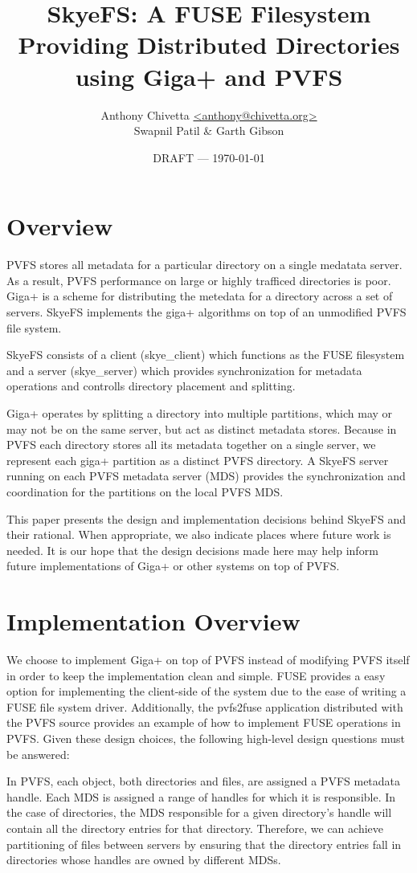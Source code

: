 \documentclass[letterpaper]{article}
\title{SkyeFS: A FUSE Filesystem Providing Distributed Directories using Giga+
and PVFS}
\author{Anthony Chivetta \url{<anthony@chivetta.org>}\\Swapnil Patil \& Garth
Gibson}
\date{DRAFT --- \today}
\begin{document}
\maketitle

\section{Overview}
PVFS stores all metadata for a particular directory on a single medatata server.
As a result, PVFS performance on large or highly trafficed directories is
poor. Giga+ is a scheme for distributing the metedata for a directory across a
set of servers.  SkyeFS implements the giga+ algorithms on top of an unmodified
PVFS file system.

SkyeFS consists of a client (skye\_\-client) which functions as the FUSE filesystem
and a server (skye\_\-server) which provides synchronization for metadata
operations and controlls directory placement and splitting.  

Giga+ operates by splitting a directory into multiple partitions, which may or
may not be on the same server, but act as distinct metadata stores.  Because in
PVFS each directory stores all its metadata together on a single server, we
represent each giga+ partition as a distinct PVFS directory.  A SkyeFS server
running on each PVFS metadata server (MDS) provides the synchronization and
coordination for the partitions on the local PVFS MDS.  

This paper presents the design and implementation decisions behind SkyeFS and
their rational.  When appropriate, we also indicate places where future work is
needed.  It is our hope that the design decisions made here may help inform
future implementations of Giga+ or other systems on top of PVFS.

\section{Implementation Overview}
We choose to implement Giga+ on top of PVFS instead of modifying PVFS itself in
order to keep the implementation clean and simple.  FUSE provides a easy option
for implementing the client-side of the system due to the ease of writing a FUSE
file system driver.  Additionally, the pvfs2\-fuse application distributed with
the PVFS source provides an example of how to implement FUSE operations in PVFS.
Given these design choices, the following high-level design questions must be answered: 

In PVFS, each object, both directories and files, are assigned a PVFS metadata
handle.  Each MDS is assigned a range of handles for which it is
responsible.  In the case of directories, the MDS responsible for a given
directory's handle will contain all the directory entries for that directory.
Therefore, we can achieve partitioning of files between servers by ensuring that
the directory entries fall in directories whose handles are owned by different
MDSs.  
\end{document}
